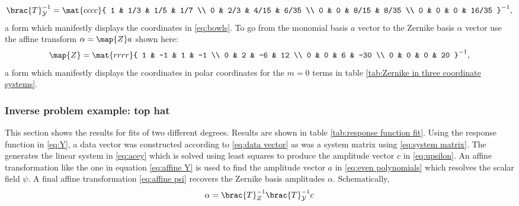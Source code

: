 \documentclass[final,leqno,onefignum,onetabnum]{siamltex1213}
\begin{document}
\begin{equation}
  \brac{T}_{\mathcal{Y}}^{-1} = \mat{cccc}{
    1 & 1/3 &  1/5 & 1/7 \\
    0 & 2/3 & 4/15 & 6/35 \\
    0 &  0  & 8/15 & 8/35 \\
    0 &  0  &  0   & 16/35 
    }^{-1},
\end{equation}
a form which manifestly displays the coordinates in \eqref{eq:bowls}.
To go from the monomial basis $a$ vector to the Zernike basis $\alpha$ vector use the affine transform $\alpha = \map{Z} a$ shown here:
  \begin{equation} 
    \map{Z} =
    \mat{rrrr}{
    1 & -1 &  1 & -1 \\
    0 & 2 & -6 & 12 \\
    0 &  0  & 6 & -30 \\
    0 &  0  &  0   & 20 
    }^{-1},
     \label{eq:affine psi}
  \end{equation}
a form which manifestly displays the coordinates in polar coordinates for the $m=0$ terms in table \ref{tab:Zernike in three coordinate systems}.
  

\subsubsection{Inverse problem example: top hat}
This section shows the results for fits of two different degrees. Results are shown in table \eqref{tab:response function fit}. Using the response function in \eqref{eq:Y}, a data vector was constructed according to \eqref{eq:data vector} as was a system matrix using \eqref{eq:system matrix}. The generates the linear system in \eqref{eq:acey} which is solved using least squares to produce the amplitude vector $c$ in \eqref{eq:upsilon}. An affine transformation like the one in equation \eqref{eq:affine Y} is used to find the amplitude vector $a$ in \eqref{eq:even polynomials} which resolves the scalar field $\psi$. A final affine transformation \eqref{eq:affine psi} recovers the Zernike basis amplitudes $\alpha$. Schematically,
  \begin{equation}   %
      \alpha = \brac{T}^{-1}_{Z} \brac{T}_{\mathcal{Y}}^{-1} c
  \end{equation}
\end{document}
